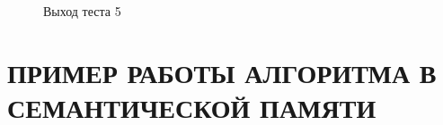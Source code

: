 \documentclass[a4paper]{article}
\begin{document}
  \begin{figure}[!h]
    \caption{Выход теста 5}
  \end{figure}
\newpage


\onehalfspacing
\section{ПРИМЕР РАБОТЫ АЛГОРИТМА В СЕМАНТИЧЕСКОЙ ПАМЯТИ}
\end{document}
